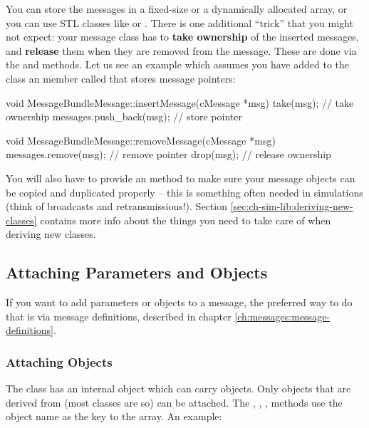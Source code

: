 You can store the messages in a fixed-size or a dynamically allocated
array, or you can use STL classes like  or .
There is one additional ``trick'' that you might not expect: your message
class has to \textbf{take ownership} of the inserted messages, and
\textbf{release} them when they are removed from the message. These are
done via the  and  methods. Let us see
an example which assumes you have added to the class an  member
called  that stores message pointers:

\begin{cpp}
void MessageBundleMessage::insertMessage(cMessage *msg)
{
    take(msg);  // take ownership
    messages.push_back(msg);  // store pointer
}

void MessageBundleMessage::removeMessage(cMessage *msg)
{
    messages.remove(msg);  // remove pointer
    drop(msg);  // release ownership
}
\end{cpp}

You will also have to provide an  method to
make sure your message objects can be copied and duplicated
properly -- this is something often needed in simulations
(think of broadcasts and retransmissions!). Section
\ref{sec:ch-sim-lib:deriving-new-classes} contains more info
about the things you need to take care of when deriving new classes.



\subsection{Attaching Parameters and Objects}

If you want to add parameters or objects to a message, the preferred
way to do that is via message definitions, described in chapter
\ref{ch:messages:message-definitions}.


\subsubsection{Attaching Objects}

The  class has an internal  object which can
carry objects. Only objects
that are derived from  (most {\opp} classes are so) can be attached.
The , , ,
 methods use the object name
as the key to the array. An example:

